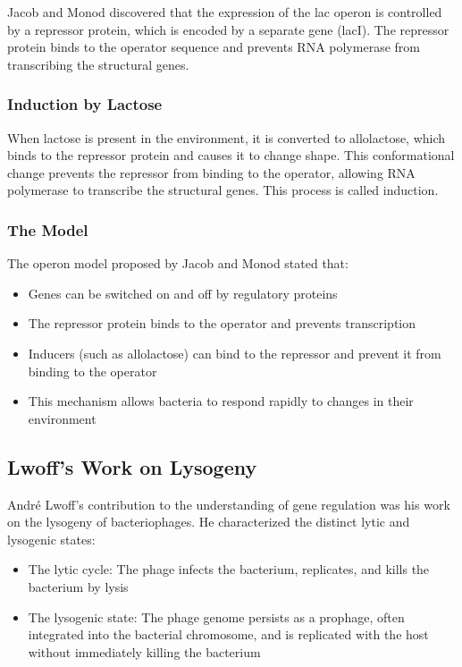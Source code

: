 Jacob and Monod discovered that the expression of the lac operon is controlled by a repressor protein, which is encoded by a separate gene (lacI). The repressor protein binds to the operator sequence and prevents RNA polymerase from transcribing the structural genes.

\subsubsection{Induction by Lactose}

When lactose is present in the environment, it is converted to allolactose, which binds to the repressor protein and causes it to change shape. This conformational change prevents the repressor from binding to the operator, allowing RNA polymerase to transcribe the structural genes. This process is called induction.

\subsubsection{The Model}

The operon model proposed by Jacob and Monod stated that:

\begin{itemize}
\item Genes can be switched on and off by regulatory proteins
\item The repressor protein binds to the operator and prevents transcription
\item Inducers (such as allolactose) can bind to the repressor and prevent it from binding to the operator
\item This mechanism allows bacteria to respond rapidly to changes in their environment
\end{itemize}

\subsection{Lwoff's Work on Lysogeny}

Andr\'e Lwoff's contribution to the understanding of gene regulation was his work on the lysogeny of bacteriophages. He characterized the distinct lytic and lysogenic states:

\begin{itemize}
\item The lytic cycle: The phage infects the bacterium, replicates, and kills the bacterium by lysis
\item The lysogenic state: The phage genome persists as a prophage, often integrated into the bacterial chromosome, and is replicated with the host without immediately killing the bacterium
\end{itemize}

